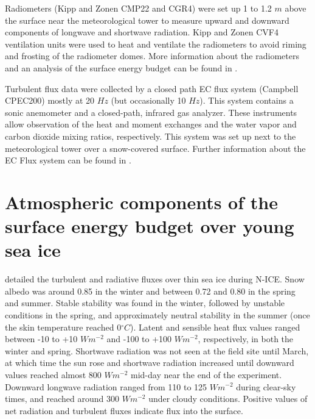 Radiometers (Kipp and Zonen CMP22 and CGR4) were set up 1 to 1.2 $m$ above the surface near the meteorological tower to measure upward and downward components of longwave and shortwave radiation. Kipp and Zonen CVF4 ventilation units were used to heat and ventilate the radiometers to avoid riming and frosting of the radiometer domes. More information about the radiometers and an analysis of the surface energy budget can be found in \citet{walden:2017}.

Turbulent flux data were collected by a closed path EC flux system (Campbell CPEC200) mostly at  20 $Hz$ (but occasionally 10 $Hz$). This system contains a sonic anemometer and a closed-path, infrared gas analyzer. These instruments allow observation of the heat and moment exchanges and the water vapor and carbon dioxide mixing ratios, respectively. This system was set up next to the meteorological tower over a snow-covered surface. Further information about the EC Flux system can be found in \citet{walden:2017}.

\section{Atmospheric components of the surface energy budget over young sea ice}
\citet{walden:2017} detailed the turbulent and radiative fluxes over thin sea ice during N-ICE. Snow albedo was around 0.85 in the winter and between 0.72 and 0.80 in the spring and summer. Stable stability was found in the winter, followed by unstable conditions in the spring, and approximately neutral stability in the summer (once the skin temperature reached 0$^{\circ}C$). Latent and sensible heat flux values ranged between -10 to +10 $Wm^{-2}$ and -100 to +100 $Wm^{-2}$, respectively, in both the winter and spring. Shortwave radiation was not seen at the field site until March, at which time the sun rose and shortwave radiation increased until downward values reached almost 800 $Wm^{-2}$ mid-day near the end of the experiment. Downward longwave radiation ranged from 110 to 125 $Wm^{-2}$ during clear-sky times, and reached around 300 $Wm^{-2}$ under cloudy conditions. Positive values of net radiation and turbulent fluxes indicate flux into the surface.

